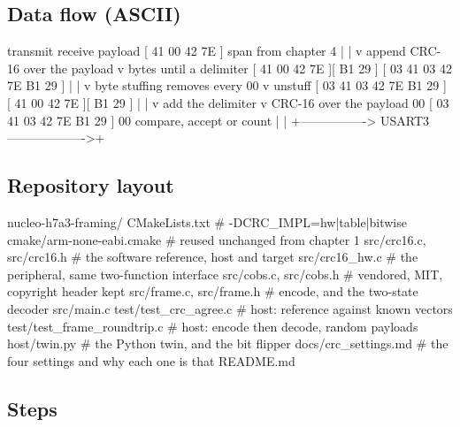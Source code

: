 \subsection*{Data flow (ASCII)}

\begin{asciiart}
  transmit                                      receive
  payload  [ 41 00 42 7E ]                      span from chapter 4
     |                                             |
     v  append CRC-16 over the payload             v  bytes until a delimiter
  [ 41 00 42 7E ][ B1 29 ]                      [ 03 41 03 42 7E B1 29 ]
     |                                             |
     v  byte stuffing removes every 00             v  unstuff
  [ 03 41 03 42 7E B1 29 ]                      [ 41 00 42 7E ][ B1 29 ]
     |                                             |
     v  add the delimiter                          v  CRC-16 over the payload
  00 [ 03 41 03 42 7E B1 29 ] 00                compare, accept or count
     |                                             |
     +----------------> USART3 ------------------->+
\end{asciiart}

\subsection*{Repository layout}

\begin{plaincode}
nucleo-h7a3-framing/
  CMakeLists.txt                  # -DCRC_IMPL=hw|table|bitwise
  cmake/arm-none-eabi.cmake       # reused unchanged from chapter 1
  src/crc16.c, src/crc16.h        # the software reference, host and target
  src/crc16_hw.c                  # the peripheral, same two-function interface
  src/cobs.c, src/cobs.h          # vendored, MIT, copyright header kept
  src/frame.c, src/frame.h        # encode, and the two-state decoder
  src/main.c
  test/test_crc_agree.c           # host: reference against known vectors
  test/test_frame_roundtrip.c     # host: encode then decode, random payloads
  host/twin.py                    # the Python twin, and the bit flipper
  docs/crc_settings.md            # the four settings and why each one is that
  README.md
\end{plaincode}

\subsection*{Steps}


